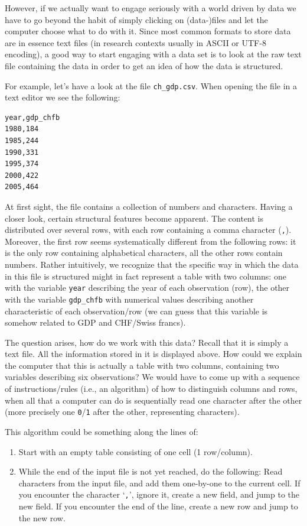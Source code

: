 \documentclass[
  12pt,
]{style/krantz}
\providecommand{\tightlist}{%
  \setlength{\itemsep}{0pt}\setlength{\parskip}{0pt}}
\begin{document}
However, if we actually want to engage seriously with a world driven by data we have to go beyond the habit of simply clicking on (data-)files and let the computer choose what to do with it. Since most common formats to store data are in essence text files (in research contexts usually in ASCII or UTF-8 encoding), a good way to start engaging with a data set is to look at the raw text file containing the data in order to get an idea of how the data is structured.

For example, let's have a look at the file \texttt{ch\_gdp.csv}. When opening the file in a text editor we see the following:

\begin{verbatim}
year,gdp_chfb
1980,184
1985,244
1990,331
1995,374
2000,422
2005,464
\end{verbatim}

At first sight, the file contains a collection of numbers and characters. Having a closer look, certain structural features become apparent. The content is distributed over several rows, with each row containing a comma character (\texttt{,}). Moreover, the first row seems systematically different from the following rows: it is the only row containing alphabetical characters, all the other rows contain numbers. Rather intuitively, we recognize that the specific way in which the data in this file is structured might in fact represent a table with two columns: one with the variable \texttt{year} describing the year of each observation (row), the other with the variable \texttt{gdp\_chfb} with numerical values describing another characteristic of each observation/row (we can guess that this variable is somehow related to GDP and CHF/Swiss francs).

The question arises, how do we work with this data? Recall that it is simply a text file. All the information stored in it is displayed above. How could we explain the computer that this is actually a table with two columns, containing two variables describing six observations? We would have to come up with a sequence of instructions/rules (i.e., an algorithm) of how to distinguish columns and rows, when all that a computer can do is sequentially read one character after the other (more precisely one \texttt{0}/\texttt{1} after the other, representing characters).

This algorithm could be something along the lines of:

\begin{enumerate}
\def\labelenumi{\arabic{enumi}.}
\tightlist
\item
  Start with an empty table consisting of one cell (1 row/column).
\item
  While the end of the input file is not yet reached, do the following:
  Read characters from the input file, and add them one-by-one to the current cell.
  If you encounter the character `\texttt{,}', ignore it, create a new field, and jump to the new field.
  If you encounter the end of the line, create a new row and jump to the new row.
\end{enumerate}
\end{document}
